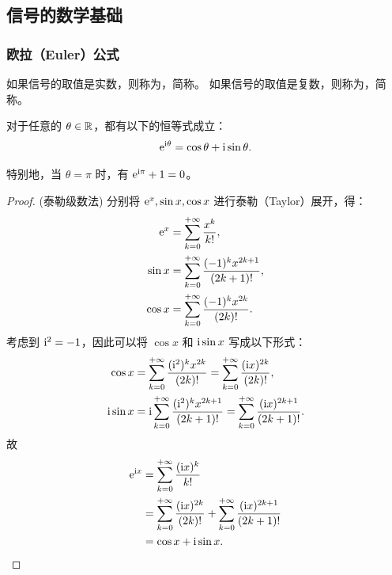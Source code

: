 \subsection{信号的数学基础}

\subsubsection{欧拉（Euler）公式}

\begin{definition}[实值信号与复值信号]
    如果信号的取值是实数，则称为，简称。
    如果信号的取值是复数，则称为，简称。
\end{definition}

\begin{theorem}[欧拉公式]
    \label{theorem:euler-formula}
    对于任意的 $\theta \in \mathbb{R}$，都有以下的恒等式成立：
    \begin{align*}
        \mathrm{e}^{\mathrm{i} \theta} = \cos \theta + \mathrm{i} \sin\theta.
    \end{align*}

    特别地，当 $\theta = \pi$ 时，有 $\mathrm{e}^{\mathrm{i}\pi} + 1 = 0$。
\end{theorem}

\begin{proof}
    (泰勒级数法)
    分别将 $\mathrm{e}^x, \sin x, \cos x$ 进行泰勒（Taylor）展开，得：
    \begin{align*}
        \mathrm{e}^x &= \sum_{k = 0}^{+\infty}\frac{x^k}{k!}, \\
        \sin x   &= \sum_{k = 0}^{+\infty}\frac{(-1)^kx^{2k + 1}}{(2k + 1)!}, \\
        \cos x   &= \sum_{k = 0}^{+\infty}\frac{(-1)^kx^{2k}}{(2k)!}.
    \end{align*}
    考虑到 $\mathrm{i}^2 = -1$，因此可以将 $\cos x$ 和 $\mathrm{i}\sin x$ 写成以下形式：
    \begin{align*}
        \cos x &= \sum_{k = 0}^{+\infty}\frac{(\mathrm{i}^2)^kx^{2k}}{(2k)!}
                = \sum_{k = 0}^{+\infty}\frac{(\mathrm{i} x)^{2k}}{(2k)!}, \\
        \mathrm{i}\sin x &= \mathrm{i}\sum_{k = 0}^{+\infty}\frac{(\mathrm{i}^2)^kx^{2k + 1}}{(2k + 1)!}
                = \sum_{k = 0}^{+\infty}\frac{(\mathrm{i} x)^{2k + 1}}{(2k + 1)!}.
    \end{align*}
    故
    \begin{align*}
        \mathrm{e}^{\mathrm{i} x} & = \sum_{k = 0}^{+\infty}\frac{(\mathrm{i} x)^k}{k!} \\
        & = \sum_{k = 0}^{+\infty}\frac{(\mathrm{i} x)^{2k}}{(2k)!} + 
            \sum_{k = 0}^{+\infty}\frac{(\mathrm{i} x)^{2k + 1}}{(2k + 1)!} \\
        & = \cos x + \mathrm{i} \sin x.
    \end{align*}
\end{proof}


